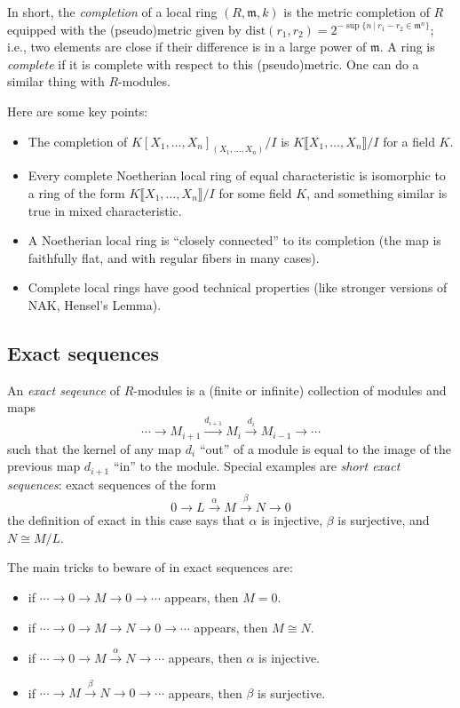 \documentclass[12pt]{amsart}
\newcommand{\m}{\mathfrak{m}}
\begin{document}
In short, the \emph{completion} of a local ring $(R,\m,k)$ is the metric completion of $R$ equipped with the (pseudo)metric given by $\mathrm{dist}(r_1,r_2) = 2^{- \sup\{ n \ | \ r_1-r_2 \in \m^{n}\}}$; i.e., two elements are close if their difference is in a large power of $\m$. A ring is \emph{complete} if it is complete with respect to this (pseudo)metric. One can do a similar thing with $R$-modules.

Here are some key points:
\begin{itemize}
\item The completion of $K[X_1,\dots,X_n]_{(X_1,\dots,X_n)}/I$ is $K\llbracket X_1,\dots,X_n\rrbracket / I$ for a field $K$.
\item Every complete Noetherian local ring of equal characteristic is isomorphic to a ring of the form $K\llbracket X_1,\dots,X_n\rrbracket / I$ for some field $K$, and something similar is true in mixed characteristic.
\item A Noetherian local ring is ``closely connected'' to its completion (the map is faithfully flat, and with regular fibers in many cases).
\item Complete local rings have good technical properties (like stronger versions of NAK, Hensel's Lemma).
\end{itemize}



\subsection*{Exact sequences} An \emph{exact seqeunce} of $R$-modules is 
a (finite or infinite) collection of modules and maps
\[ \cdots  \rightarrow M_{i+1} \xrightarrow{d_{i+1}} M_{i} \xrightarrow{d_{i}} M_{i-1} \rightarrow \cdots\]
such that the kernel of any map  $d_{i}$  ``out'' of a module is equal to the image of the previous map $d_{i+1}$ ``in'' to the module. Special examples are \emph{short exact sequences}: exact sequences of the form
\[ 0  \rightarrow L \xrightarrow{\alpha} M \xrightarrow{\beta} N \rightarrow 0\]
the definition of exact in this case says that $\alpha$ is injective, $\beta$ is surjective, and $N\cong M/L$.

The main tricks to beware of in exact sequences are:
\begin{itemize}
\item if $\cdots \to  0 \to M \to 0 \to \cdots$ appears, then $M=0$.
\item if $\cdots \to  0 \to M \to N \to 0 \to \cdots$ appears, then $M\cong N$.
\item if $\cdots \to  0 \to M \xrightarrow{\alpha} N \to \cdots$ appears, then $\alpha$ is injective.
\item if $\cdots \to  M \xrightarrow{\beta} N \to 0 \to  \cdots$ appears, then $\beta$ is surjective.
\end{itemize}
\end{document}
